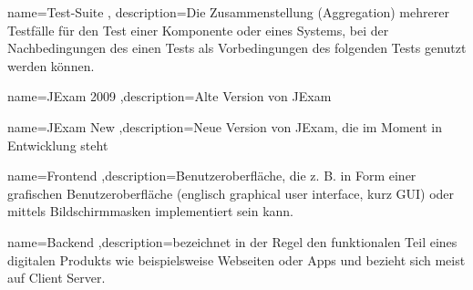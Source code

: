 {name=Test-Suite , description={Die Zusammenstellung (Aggregation) mehrerer Testf\"alle f\"ur den Test einer Komponente oder eines Systems, bei der Nachbedingungen des einen Tests als Vorbedingungen des folgenden Tests genutzt werden k\"onnen.}}

{name=JExam 2009 ,description={Alte Version von JExam}}

{name=JExam New ,description={Neue Version von JExam, die im Moment in Entwicklung steht}}

{name=Frontend ,description={Benutzeroberfläche, die z. B. in Form einer grafischen Benutzeroberfläche (englisch graphical user interface, kurz GUI) oder mittels Bildschirmmasken implementiert sein kann.}}

{name=Backend ,description={bezeichnet in der Regel den funktionalen Teil eines digitalen Produkts wie beispielsweise Webseiten oder Apps und bezieht sich meist auf Client Server.}}